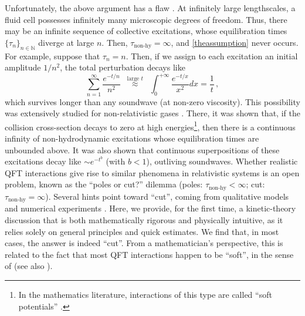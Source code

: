 \documentclass[a4paper, amsfonts, amssymb, amsmath, reprint, showkeys, nofootinbib, twoside, onecolumn,notitlepage,,longbibliography]{revtex4-2}
\theoremstyle{definition}
\theoremstyle{theorem}
\theoremstyle{corollary}
\begin{document}
Unfortunately, the above argument has a flaw \cite{KovtunStickiness2011,kovtun_lectures_2012}. At infinitely large lengthscales, a fluid cell possesses infinitely many microscopic degrees of freedom. Thus, there may be an infinite sequence of collective excitations, whose equilibration times $\{\tau_n\}_{n\in \mathbb{N}}$ diverge at large $n$. Then, $\tau_{\text{non-hy}}=\infty$, and \eqref{theassumption} never occurs. For example, suppose that $\tau_n=n$. Then, if we assign to each excitation an initial amplitude $1/n^2$, the total perturbation decays like
\begin{equation}\label{fluctuzzuz}
    \sum_{n=1}^{\infty} \dfrac{e^{-t/n}}{n^2} \, \, \, \stackrel{\text{large } t}{\approx} \, \, \, \int_0^{+\infty} \dfrac{e^{-t/x}}{x^2} dx = \dfrac{1}{t} \, ,
\end{equation}
which survives longer than any soundwave (at non-zero viscosity). This possibility was extensively studied for non-relativistic gases \cite{Grad1963,McLennan1965,Caflish1980,CatlfishII1980}. There, it was shown that, if the collision cross-section decays to zero at high energies\footnote{In the mathematics literature, interactions of this type are called ``soft potentials'' \cite{Caflish1980,Strain2010}.}, then there is a continuous infinity of non-hydrodynamic excitations whose equilibration times are unbounded above. It was also shown that continuous superpositions of these excitations decay like ${\sim} e^{-t^b}$ (with $b{<}1$), outliving soundwaves. Whether realistic QFT interactions give rise to similar phenomena in relativistic systems is an open problem, known as the ``poles or cut?'' dilemma \cite{Moore:2018mma} (poles: $\tau_{\text{non-hy}}{<}\infty$; cut: $\tau_{\text{non-hy}}{=}\infty$). Several hints point toward ``cut'', coming from qualitative models \cite{Kurkela:2017xis,Gavassino2024InfiniteOrder,RochaGavassinoFluctu:2024afv} and numerical experiments \cite{Moore:2018mma,Ochsenfeld:2023wxz,RochaCut2024cge}. Here, we provide, for the first time, a kinetic-theory discussion that is both mathematically rigorous and physically intuitive, as it relies solely on general principles and quick estimates. We find that, in most cases, the answer is indeed ``cut''. From a mathematician's perspective, this is related to the fact that most QFT interactions happen to be ``soft'', in the sense of \cite{Dudynski1988} (see also \cite{Hu:2024tnn}).

\end{document}
